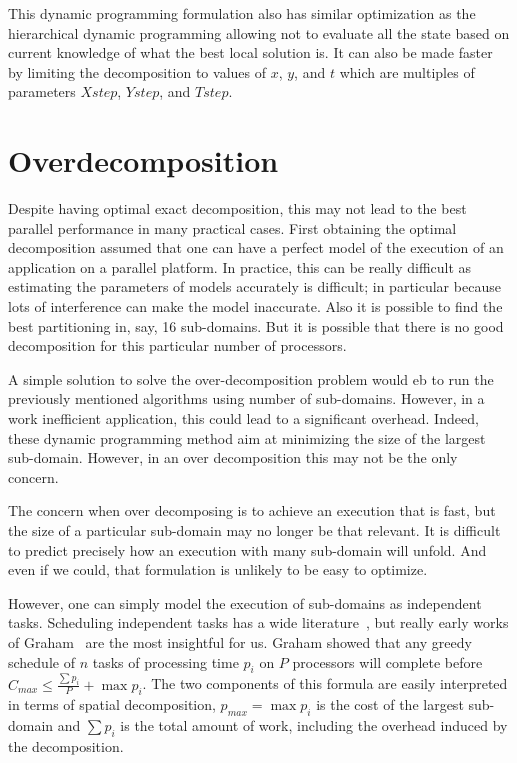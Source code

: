 \documentclass[10pt, conference, compsocconf]{IEEEtran}
\begin{document}
This dynamic programming formulation also has similar optimization as
the hierarchical dynamic programming allowing not to evaluate all the
state based on current knowledge of what the best local solution
is. It can also be made faster by limiting the decomposition to values
of $x$, $y$, and $t$ which are multiples of parameters $Xstep$,
$Ystep$, and $Tstep$.

\section{Overdecomposition}
\label{sec:overdecomposition}

Despite having optimal exact decomposition, this may not lead to the
best parallel performance in many practical cases. First obtaining the
optimal decomposition assumed that one can have a perfect model of the
execution of an application on a parallel platform. In practice, this
can be really difficult as estimating the parameters of models
accurately is difficult; in particular because lots of interference
can make the model inaccurate.
Also it is possible to find the best partitioning in, say, 16
sub-domains. But it is possible that there is no good decomposition for
this particular number of processors.

A simple solution to solve the over-decomposition problem would eb to
run the previously mentioned algorithms using number of
sub-domains. However, in a work inefficient application, this could
lead to a significant overhead. Indeed, these dynamic programming
method aim at minimizing the size of the largest sub-domain. However,
in an over decomposition this may not be the only concern.

The concern when over decomposing is to achieve an execution that is
fast, but the size of a particular sub-domain may no longer be that
relevant. It is difficult to predict precisely how an execution with
many sub-domain will unfold. And even if we could, that formulation is
unlikely to be easy to optimize.

However, one can simply model the execution of sub-domains as
independent tasks. Scheduling independent tasks has a wide
literature~\cite{handbook}, but really early works of Graham~\cite{Graham66} are the
most insightful for us. Graham showed that any greedy schedule of $n$
tasks of processing time $p_i$ on $P$ processors will complete before
$C_{max} \leq \frac{\sum p_i}{P} + \max p_i$. The two components of
this formula are easily interpreted in terms of spatial decomposition,
$p_{max} = \max p_i$ is the cost of the largest sub-domain and $\sum p_i$ is the
total amount of work, including the overhead induced by the
decomposition.
\end{document}
